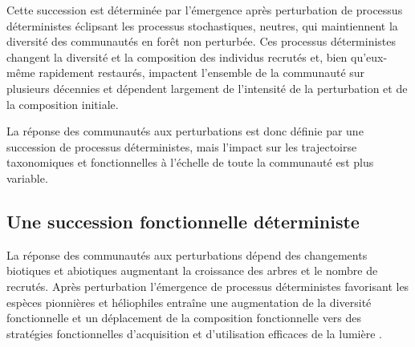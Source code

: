 \documentclass[
  11pt,
  french,
  A4paper,
  extrafontsizes,onecolumn,openright
  ]{memoir}
\begin{document}
Cette succession est déterminée par l'émergence après perturbation de
processus déterministes éclipsant les processus stochastiques, neutres,
qui maintiennent la diversité des communautés en forêt non perturbée.
Ces processus déterministes changent la diversité et la composition des
individus recrutés et, bien qu'eux-même rapidement restaurés, impactent
l'ensemble de la communauté sur plusieurs décennies et dépendent
largement de l'intensité de la perturbation et de la composition
initiale.

La réponse des communautés aux perturbations est donc définie par une
succession de processus déterministes, mais l'impact sur les
trajectoirse taxonomiques et fonctionnelles à l'échelle de toute la
communauté est plus variable.

\subsection{Une succession fonctionnelle
déterministe}\label{une-succession-fonctionnelle-deterministe}

La réponse des communautés aux perturbations dépend des changements
biotiques et abiotiques augmentant la croissance des arbres et le nombre
de recrutés. Après perturbation l'émergence de processus déterministes
favorisant les espèces pionnières et héliophiles entraîne une
augmentation de la diversité fonctionnelle et un déplacement de la
composition fonctionnelle vers des stratégies fonctionnelles
d'acquisition et d'utilisation efficaces de la lumière
\autocites{Violle2007b}{Baraloto2012a}.
\end{document}
